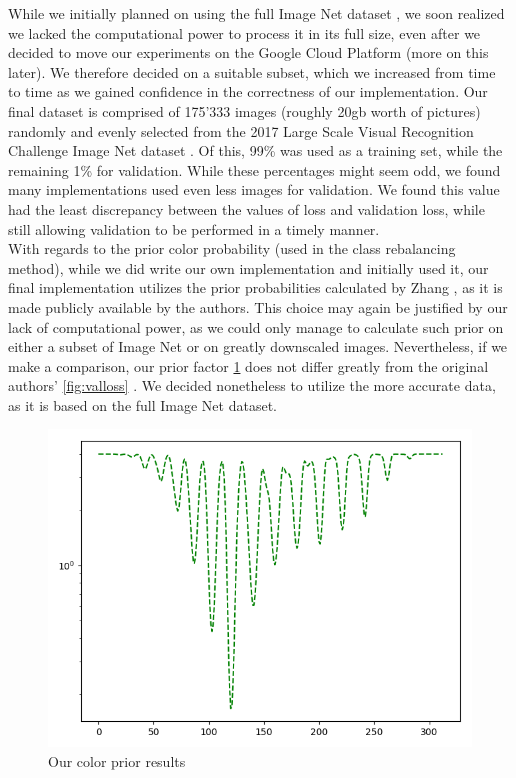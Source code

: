 \documentclass[twoside,twocolumn]{article}
\begin{document}
While we initially planned on using the full Image Net dataset \cite{Imagenet}, we soon realized we lacked the computational power to process it in its full size, even after we decided to move our experiments on the Google Cloud Platform \cite{GCP} (more on this later). We therefore decided on a suitable subset, which we increased from time to time as we gained confidence in the correctness of our implementation. Our final dataset is comprised of 175’333 images (roughly 20gb worth of pictures) randomly and evenly selected from the 2017 Large Scale Visual Recognition Challenge Image Net dataset \cite{ImNetChallenge:2017}. Of this, 99\% was used as a training set, while the remaining 1\% for validation. While these percentages might seem odd, we found many implementations used even less images for validation. We found this value had the least discrepancy between the values of loss and validation loss, while still allowing validation to be performed in a timely manner.\\
With regards to the prior color probability (used in the class rebalancing method), while we did write our own implementation and initially used it, our final implementation utilizes the prior probabilities calculated by Zhang \cite{Zhang:2016}, as it is made publicly available by the authors. This choice may again be justified by our lack of computational power, as we could only manage to calculate such prior on either a subset of Image Net or on greatly downscaled images. Nevertheless, if we make a comparison, our prior factor \ref{fig:oursprior} does not differ greatly from the original authors’ \ref{fig:valloss} . We decided nonetheless to utilize the more accurate data, as it is based on the full Image Net dataset.

\newpage

\begin{figure}[h]
	\includegraphics[width=\linewidth]{img/ours.png}
	\caption{Our color prior results}
	\label{fig:oursprior}
\end{figure}
\end{document}
